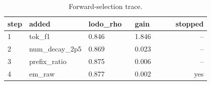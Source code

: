 \begin{table}[htbp]
\centering\scriptsize
\caption{Forward-selection trace.}
\label{tab:selection_trace}
\setlength{\tabcolsep}{3pt}
\begin{tabular}{lp{0.200\linewidth}p{0.277\linewidth}p{0.323\linewidth}r}
\toprule
step & added & lodo\_\allowbreak{}rho & gain & stopped \\
\midrule
1 & tok\_\allowbreak{}f1 & 0.846 & 1.846 & -- \\
2 & num\_\allowbreak{}decay\_\allowbreak{}2p5 & 0.869 & 0.023 & -- \\
3 & prefix\_\allowbreak{}ratio & 0.875 & 0.006 & -- \\
4 & em\_\allowbreak{}raw & 0.877 & 0.002 & yes \\
\bottomrule
\end{tabular}
\end{table}
